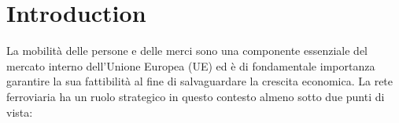 \chapter{Introduction}

\label{ch:introduction}
La mobilità delle persone e delle merci sono una componente essenziale del mercato interno dell'Unione Europea (UE) ed è di fondamentale importanza garantire la sua fattibilità al fine di salvaguardare la crescita economica.
La rete ferroviaria ha un ruolo strategico in questo contesto almeno sotto due punti di vista:
